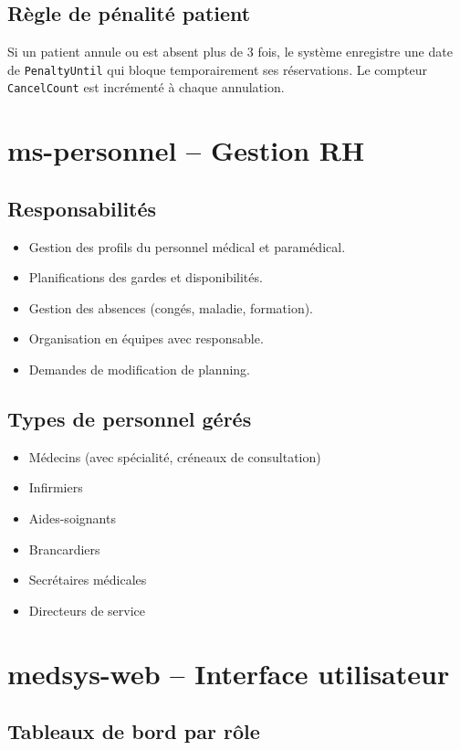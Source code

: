 \subsection{Règle de pénalité patient}
Si un patient annule ou est absent plus de 3 fois, le système enregistre
une date de \texttt{PenaltyUntil} qui bloque temporairement ses réservations.
Le compteur \texttt{CancelCount} est incrémenté à chaque annulation.

\section{ms-personnel -- Gestion RH}

\subsection{Responsabilités}
\begin{itemize}[itemsep=3pt]
  \item Gestion des profils du personnel médical et paramédical.
  \item Planifications des gardes et disponibilités.
  \item Gestion des absences (congés, maladie, formation).
  \item Organisation en équipes avec responsable.
  \item Demandes de modification de planning.
\end{itemize}

\subsection{Types de personnel gérés}

\begin{itemize}
  \item Médecins (avec spécialité, créneaux de consultation)
  \item Infirmiers
  \item Aides-soignants
  \item Brancardiers
  \item Secrétaires médicales
  \item Directeurs de service
\end{itemize}

\section{medsys-web -- Interface utilisateur}

\subsection{Tableaux de bord par rôle}

